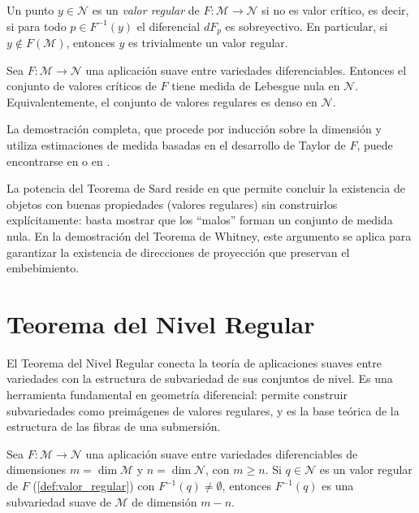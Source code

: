 \begin{definition}\label{def:valor_regular}
Un punto $y \in \mathcal{N}$ es un \textit{valor regular} de $F: \mathcal{M} \to \mathcal{N}$ si no es valor crítico, es decir, si para todo $p \in F^{-1}(y)$ el diferencial $dF_p$ es sobreyectivo. En particular, si $y \notin F(\mathcal{M})$, entonces $y$ es trivialmente un valor regular.
\end{definition}

\begin{theorem}\label{thm:sard}
Sea $F: \mathcal{M} \to \mathcal{N}$ una aplicación suave entre variedades diferenciables. Entonces el conjunto de valores críticos de $F$ tiene medida de Lebesgue nula en $\mathcal{N}$. Equivalentemente, el conjunto de valores regulares es denso en $\mathcal{N}$.
\end{theorem}

La demostración completa, que procede por inducción sobre la dimensión y utiliza estimaciones de medida basadas en el desarrollo de Taylor de $F$, puede encontrarse en \citet[Capítulo 6, Teorema 6.10]{lee2012introduction} o en \citet[Capítulo 3]{milnor1965topology}.

\begin{remark}
La potencia del Teorema de Sard reside en que permite concluir la existencia de objetos con buenas propiedades (valores regulares) sin construirlos explícitamente: basta mostrar que los ``malos'' forman un conjunto de medida nula. En la demostración del Teorema de Whitney, este argumento se aplica para garantizar la existencia de direcciones de proyección que preservan el embebimiento.
\end{remark}

\section{Teorema del Nivel Regular}\label{sec:nivel_regular}

El Teorema del Nivel Regular conecta la teoría de aplicaciones suaves entre variedades con la estructura de subvariedad de sus conjuntos de nivel. Es una herramienta fundamental en geometría diferencial: permite construir subvariedades como preimágenes de valores regulares, y es la base teórica de la estructura de las fibras de una submersión.

\begin{theorem}\label{thm:nivel_regular}
Sea $F: \mathcal{M} \to \mathcal{N}$ una aplicación suave entre variedades diferenciables de dimensiones $m = \dim \mathcal{M}$ y $n = \dim \mathcal{N}$, con $m \geq n$. Si $q \in \mathcal{N}$ es un valor regular de $F$ (\autoref{def:valor_regular}) con $F^{-1}(q) \neq \emptyset$, entonces $F^{-1}(q)$ es una subvariedad suave de $\mathcal{M}$ de dimensión $m - n$.
\end{theorem}

